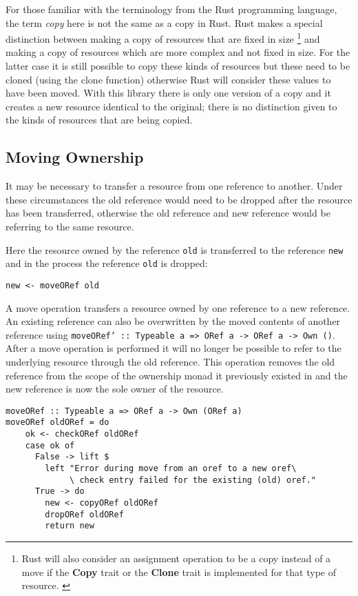 \documentclass[onehalf,11pt]{beavtex}
\begin{document}
For those familiar with the terminology from the Rust programming language, the
term \textit{copy} here is not the same as a copy in Rust. Rust makes a special
distinction between making a copy of resources that are fixed in size
\footnote{Rust will also consider an assignment operation to be a copy instead
  of a move if the \textbf{Copy} trait or the \textbf{Clone} trait is
  implemented for that type of resource. \cite{rust_book_traits}
  \cite{rust_docs_clone_trait}}
and making a copy of resources which are more complex and not fixed in size.
For the latter case it is still possible to copy these kinds of resources but these
need to be cloned (using the clone function) otherwise Rust will consider these
values to have been moved. \cite{rust_book_ownership}
With this library there is only one version of a copy and it creates a new
resource identical to the original; there is no distinction given to the kinds
of resources that are being copied.

\subsection{Moving Ownership}

It may be necessary to transfer a resource from one reference to another.
Under these circumstances the old reference would need to be dropped after
the resource has been transferred, otherwise the old reference and new
reference would be referring to the same resource.

Here the resource owned by the reference \texttt{old} is
transferred to the reference \texttt{new} and in the process the
reference \texttt{old} is dropped:

\begin{verbatim}
new <- moveORef old
\end{verbatim}

A move operation transfers a resource owned by one reference to a new reference.
An existing reference can also be overwritten by the moved contents of another
reference using \texttt{moveORef' :: Typeable a => ORef a -> ORef a -> Own ()}.
After a move operation is performed it will no longer be possible to refer to the
underlying resource through the old reference.
This operation removes the old reference from the scope of the ownership monad it
previously existed in and the new reference is now the sole owner of the resource.

\begin{verbatim}
moveORef :: Typeable a => ORef a -> Own (ORef a)
moveORef oldORef = do
    ok <- checkORef oldORef
    case ok of
      False -> lift $
        left "Error during move from an oref to a new oref\
             \ check entry failed for the existing (old) oref."
      True -> do
        new <- copyORef oldORef
        dropORef oldORef
        return new
\end{verbatim}
\end{document}

